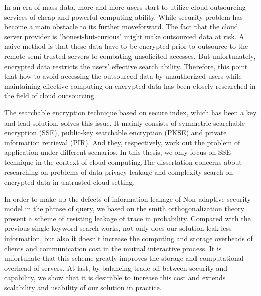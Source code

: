 \begin{englishabstract}


  In an era of mass data, more and more users start to utilize cloud outsourcing services of cheap and powerful computing ability. While security problem has become a main obstacle to its further moveforward. The fact that the cloud server provider is "honest-but-curious" might make outsourced data at risk. A naive method is that these data have to be encrypted prior to outsource to the remote semi-trusted servers to combating unsolicited accesses. But unfortunately, encrypted data restricts the users' effective search ability. Therefore, this point that how to avoid accessing the outsourced data by unauthorized users while maintaining effective computing on encrypted data has been closely researched in the field of cloud outsourcing.

  The searchable encryption technique based on secure index, which has been a key and lead solution, solves this issue. It mainly consists of symmetric searchable encryption (SSE), public-key searchable encryption (PKSE) and private information retrieval (PIR). And they, respectively, work out the problem of application under different scenarios. In this thesis, we only focus on SSE technique in the context of cloud computing.The dissertation concerns about researching on problems of data privacy leakage and complexity search on encrypted data in untrusted cloud setting.

  In order to make up the defects of information leakage of Non-adaptive security model in the phrase of query, we based on the smith orthogonalization theory present a scheme of resisting leakage of trace in probability. Compared with the previous single keyword search works, not only does our solution leak less information, but also it doesn't increase the computing and storage overheads of clients and communication cost in the mutual interactive process. It is unfortunate that this scheme greatly improves the storage and computational overhead of servers. At last, by balancing trade-off between security and capability, we show that it is desirable to increase this cost and extends scalability and usability of our solution in practice.


\end{englishabstract}
